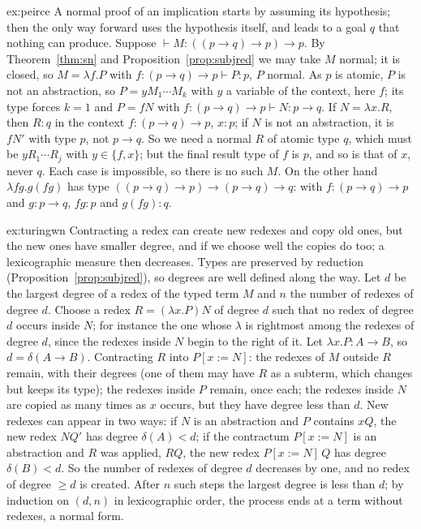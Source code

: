\begin{solution}{ex:peirce}
\idea A normal proof of an implication starts by assuming its hypothesis; then the only way forward uses the hypothesis itself, and leads to a goal $q$ that nothing can produce.
\writeup Suppose $\vdash M:((p\to q)\to p)\to p$. By Theorem~\ref{thm:sn} and Proposition~\ref{prop:subjred} we may take $M$ normal; it is closed, so $M=\lambda f.P$ with $f:(p\to q)\to p\vdash P:p$, $P$ normal. As $p$ is atomic, $P$ is not an abstraction, so $P=yM_1\cdots M_k$ with $y$ a variable of the context, here $f$; its type forces $k=1$ and $P=fN$ with $f:(p\to q)\to p\vdash N:p\to q$. If $N=\lambda x.R$, then $R:q$ in the context $f:(p\to q)\to p$, $x:p$; if $N$ is not an abstraction, it is $fN'$ with type $p$, not $p\to q$. So we need a normal $R$ of atomic type $q$, which must be $yR_1\cdots R_j$ with $y\in\{f,x\}$; but the final result type of $f$ is $p$, and so is that of $x$, never $q$. Each case is impossible, so there is no such $M$. On the other hand $\lambda fg.g(f g)$ has type $((p\to q)\to p)\to(p\to q)\to q$: with $f:(p\to q)\to p$ and $g:p\to q$, $fg:p$ and $g(fg):q$.
\end{solution}

\begin{solution}{ex:turingwn}
\idea Contracting a redex can create new redexes and copy old ones, but the new ones have smaller degree, and if we choose well the copies do too; a lexicographic measure then decreases.
\writeup Types are preserved by reduction (Proposition~\ref{prop:subjred}), so degrees are well defined along the way. Let $d$ be the largest degree of a redex of the typed term $M$ and $n$ the number of redexes of degree $d$. Choose a redex $R=(\lambda x.P)N$ of degree $d$ such that no redex of degree $d$ occurs inside $N$; for instance the one whose $\lambda$ is rightmost among the redexes of degree $d$, since the redexes inside $N$ begin to the right of it. Let $\lambda x.P:A\to B$, so $d=\delta(A\to B)$. Contracting $R$ into $P[x:=N]$: the redexes of $M$ outside $R$ remain, with their degrees (one of them may have $R$ as a subterm, which changes but keeps its type); the redexes inside $P$ remain, once each; the redexes inside $N$ are copied as many times as $x$ occurs, but they have degree less than $d$. New redexes can appear in two ways: if $N$ is an abstraction and $P$ contains $xQ$, the new redex $NQ'$ has degree $\delta(A)<d$; if the contractum $P[x:=N]$ is an abstraction and $R$ was applied, $RQ$, the new redex $P[x:=N]\,Q$ has degree $\delta(B)<d$. So the number of redexes of degree $d$ decreases by one, and no redex of degree $\ge d$ is created. After $n$ such steps the largest degree is less than $d$; by induction on $(d,n)$ in lexicographic order, the process ends at a term without redexes, a normal form.
\end{solution}

